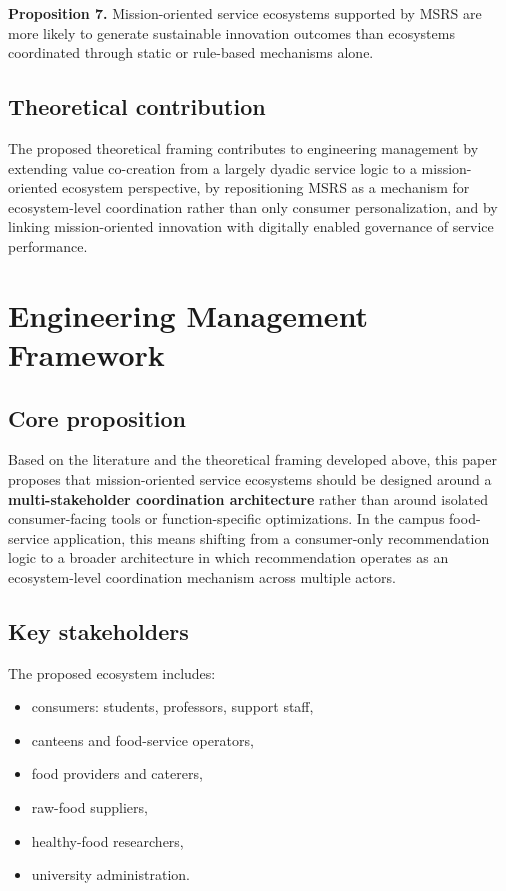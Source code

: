 \documentclass[
  letterpaper,
  DIV=11,
  numbers=noendperiod]{scrartcl}
\providecommand{\tightlist}{%
  \setlength{\itemsep}{0pt}\setlength{\parskip}{0pt}}
\begin{document}
\textbf{Proposition 7.} Mission-oriented service ecosystems supported by
MSRS are more likely to generate sustainable innovation outcomes than
ecosystems coordinated through static or rule-based mechanisms alone.

\subsection{Theoretical contribution}\label{theoretical-contribution}

The proposed theoretical framing contributes to engineering management
by extending value co-creation from a largely dyadic service logic to a
mission-oriented ecosystem perspective, by repositioning MSRS as a
mechanism for ecosystem-level coordination rather than only consumer
personalization, and by linking mission-oriented innovation with
digitally enabled governance of service performance.

\section{Engineering Management
Framework}\label{engineering-management-framework}

\subsection{Core proposition}\label{core-proposition}

Based on the literature and the theoretical framing developed above,
this paper proposes that mission-oriented service ecosystems should be
designed around a \textbf{multi-stakeholder coordination architecture}
rather than around isolated consumer-facing tools or function-specific
optimizations. In the campus food-service application, this means
shifting from a consumer-only recommendation logic to a broader
architecture in which recommendation operates as an ecosystem-level
coordination mechanism across multiple actors.

\subsection{Key stakeholders}\label{key-stakeholders}

The proposed ecosystem includes:

\begin{itemize}
\tightlist
\item
  consumers: students, professors, support staff,
\item
  canteens and food-service operators,
\item
  food providers and caterers,
\item
  raw-food suppliers,
\item
  healthy-food researchers,
\item
  university administration.
\end{itemize}
\end{document}

